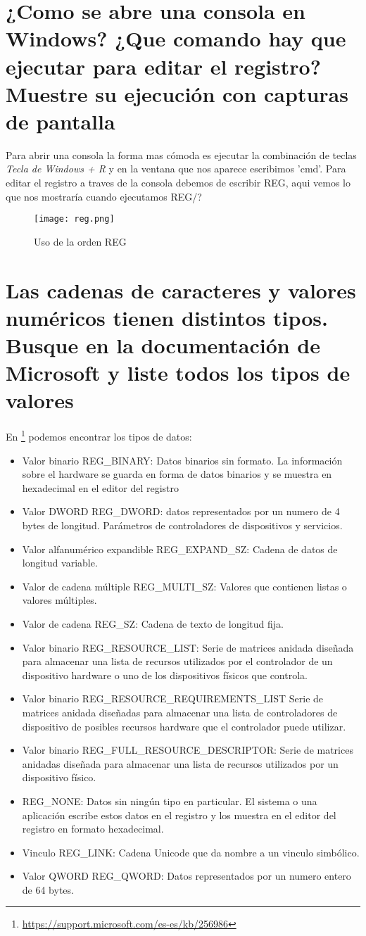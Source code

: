 \section{¿Como se abre una consola en Windows? ¿Que comando hay que ejecutar para editar el registro? Muestre su ejecución con capturas de pantalla}
Para abrir una consola la forma mas cómoda es ejecutar la combinación de teclas \textit{Tecla de Windows + R} y en la ventana que nos aparece escribimos 'cmd'.
Para editar el registro a traves de la consola debemos de escribir REG, aqui vemos lo que nos mostraría cuando ejecutamos REG/?
\begin{figure}[H] 
\centering
\texttt{[image: reg.png]}  
\label{figura5:}
\caption{Uso de la orden REG}
\end{figure}
\section{Las cadenas de caracteres y valores numéricos tienen distintos tipos. Busque en la documentación de Microsoft y liste todos los tipos de valores}
En \footnote{\url{https://support.microsoft.com/es-es/kb/256986}}
podemos encontrar los tipos de datos:
\begin{itemize}
\item Valor binario REG\_BINARY: Datos binarios sin formato. La información sobre el hardware se guarda en forma de datos binarios y se muestra en hexadecimal en el editor del registro
\item Valor DWORD REG\_DWORD: datos representados por un numero de 4 bytes de longitud. Parámetros de controladores de dispositivos y servicios.
\item Valor alfanumérico expandible REG\_EXPAND\_SZ: Cadena de datos de longitud variable.
\item Valor de cadena múltiple REG\_MULTI\_SZ: Valores que contienen listas o valores múltiples.
\item Valor de cadena REG\_SZ: Cadena de texto de longitud fija.
\item Valor binario REG\_RESOURCE\_LIST: Serie de matrices anidada diseñada para almacenar una lista de recursos utilizados por el controlador de un dispositivo hardware o uno de los dispositivos físicos que controla. 
\item Valor binario REG\_RESOURCE\_REQUIREMENTS\_LIST Serie de matrices anidada diseñadas para almacenar una lista de controladores de dispositivo de posibles recursos hardware que el controlador puede utilizar.
\item Valor binario REG\_FULL\_RESOURCE\_DESCRIPTOR: Serie de matrices anidadas diseñada para almacenar una lista de recursos utilizados por un dispositivo físico.
\item REG\_NONE: Datos sin ningún tipo en particular. El sistema o una aplicación escribe estos datos en el registro y los muestra en el editor del registro en formato hexadecimal.
\item Vinculo REG\_LINK: Cadena Unicode que da nombre a un vinculo simbólico.
\item Valor QWORD REG\_QWORD: Datos representados por un numero entero de 64 bytes.
\end{itemize}
